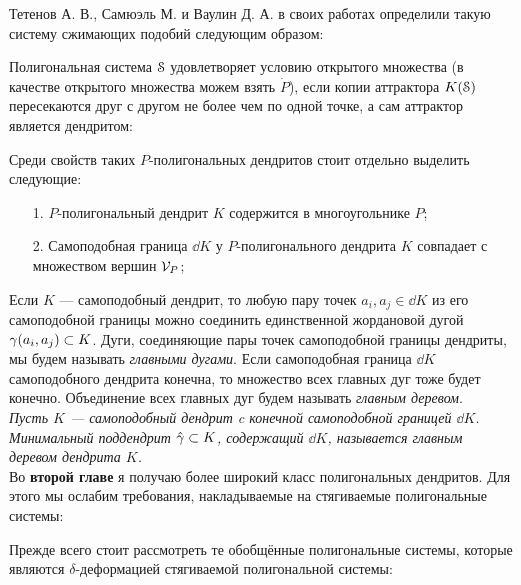 Тетенов А. В., Самюэль М. и Ваулин Д. А. в своих работах \cite{TSV2017, STV2017} определили такую систему сжимающих подобий следующим образом:


Полигональная система ${\EuScript S}$ удовлетворяет условию открытого множества (в качестве открытого множества можем взять $\dot P$), если копии аттрактора $K({\EuScript S})$ пересекаются друг с другом не более чем по одной точке, а сам аттрактор является дендритом:


Среди свойств таких $P$-полигональных дендритов стоит отдельно выделить следующие:
\begin{enumerate}
\item[1.] $P$-полигональный дендрит $K$ содержится в многоугольнике $P$;
\item[2.] Самоподобная граница $\dd K$ у $P$-полигонального дендрита $K$ совпадает с множеством вершин ${\mathcal V}_P$;
\end{enumerate}

Если $K$ --- самоподобный дендрит, то любую пару точек $a_i,a_j\in\dd K$ из его самоподобной границы можно соединить единственной жордановой дугой $\gamma(a_i,a_j)\subset K$.
Дуги, соединяющие пары точек самоподобной границы дендриты, мы будем называть {\em главными дугами}.
Если самоподобная граница $\dd K$ самоподобного дендрита конечна, то множество всех главных дуг тоже будет конечно.
Объединение всех главных дуг будем называть {\em главным деревом}.\\

{\em Пусть $K$ --- самоподобный дендрит c конечной самоподобной границей $\dd K$. 
Минимальный поддендрит $\hat\gamma\subset K$, содержащий $\dd K$, называется {\em главным деревом} дендрита $K$.}\\


Во \textbf{второй главе} я получаю более широкий класс полигональных дендритов. 
Для этого мы ослабим требования, накладываемые на стягиваемые полигональные системы:


Прежде всего стоит рассмотреть те обобщённые полигональные системы, которые являются $\delta$-деформацией стягиваемой полигональной системы:



